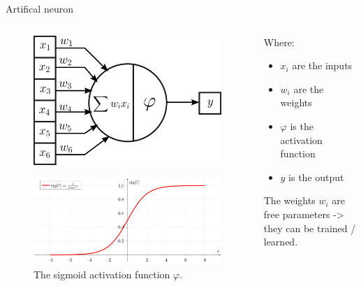 \documentclass[10pt]{beamer}
\begin{document}
\begin{frame}{Artifical neuron}
	\begin{columns}
		\begin{column}{0.6\textwidth}
			\begin{figure}
				\centering
				\includegraphics[width=0.8\linewidth]{artificial_neuron}
			\end{figure}
			\begin{figure}
				\centering
				\includegraphics[width=0.7\linewidth]{sigmoid}
				\\{The sigmoid activation function $\varphi$.}
			\end{figure}
		\end{column}
		\begin{column}{0.4\textwidth}
		    Where:
			\begin{itemize}
				\item $x_i$ are the inputs
				\item $w_i$ are the weights
				\item $\varphi$ is the activation function
				\item $y$ is the output
			\end{itemize}
			The weights $w_i$ are \alert{free parameters} -> they can be \alert{trained} / \alert{learned}.
		\end{column}
	\end{columns}
\end{frame}
\end{document}

